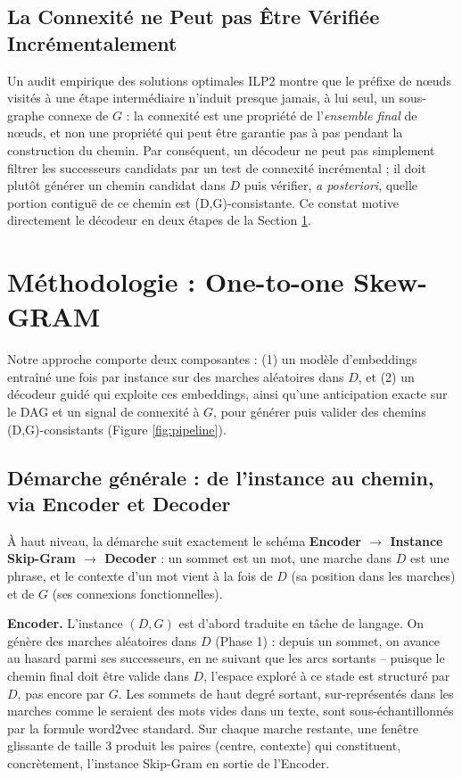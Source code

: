 \documentclass{llncs}
\begin{document}
\subsection{La Connexité ne Peut pas Être Vérifiée Incrémentalement}
\label{sec:incremental}

Un audit empirique des solutions optimales ILP2 montre que le préfixe de nœuds visités à une étape intermédiaire n'induit presque jamais, à lui seul, un sous-graphe connexe de $G$ : la connexité est une propriété de l'\emph{ensemble final} de nœuds, et non une propriété qui peut être garantie pas à pas pendant la construction du chemin. Par conséquent, un décodeur ne peut pas simplement filtrer les successeurs candidats par un test de connexité incrémental ; il doit plutôt générer un chemin candidat dans $D$ puis vérifier, \emph{a posteriori}, quelle portion contiguë de ce chemin est (D,G)-consistante. Ce constat motive directement le décodeur en deux étapes de la Section \ref{sec:method}.

\section{Méthodologie : One-to-one Skew-GRAM}
\label{sec:method}

Notre approche comporte deux composantes : (1) un modèle d'embeddings entraîné une fois par instance sur des marches aléatoires dans $D$, et (2) un décodeur guidé qui exploite ces embeddings, ainsi qu'une anticipation exacte sur le DAG et un signal de connexité à $G$, pour générer puis valider des chemins (D,G)-consistants (Figure \ref{fig:pipeline}).

\subsection{Démarche générale : de l'instance au chemin, via Encoder et Decoder}
\label{sec:demarche}

À haut niveau, la démarche suit exactement le schéma \textbf{Encoder $\to$ Instance Skip-Gram $\to$ Decoder} : un sommet est un mot, une marche dans $D$ est une phrase, et le contexte d'un mot vient à la fois de $D$ (sa position dans les marches) et de $G$ (ses connexions fonctionnelles).

\textbf{Encoder.} L'instance $(D,G)$ est d'abord traduite en tâche de langage. On génère des marches aléatoires dans $D$ (Phase 1) : depuis un sommet, on avance au hasard parmi ses successeurs, en ne suivant que les arcs sortants -- puisque le chemin final doit être valide dans $D$, l'espace exploré à ce stade est structuré par $D$, pas encore par $G$. Les sommets de haut degré sortant, sur-représentés dans les marches comme le seraient des mots vides dans un texte, sont sous-échantillonnés par la formule word2vec standard. Sur chaque marche restante, une fenêtre glissante de taille 3 produit les paires (centre, contexte) qui constituent, concrètement, l'instance Skip-Gram en sortie de l'Encoder.
\end{document}
